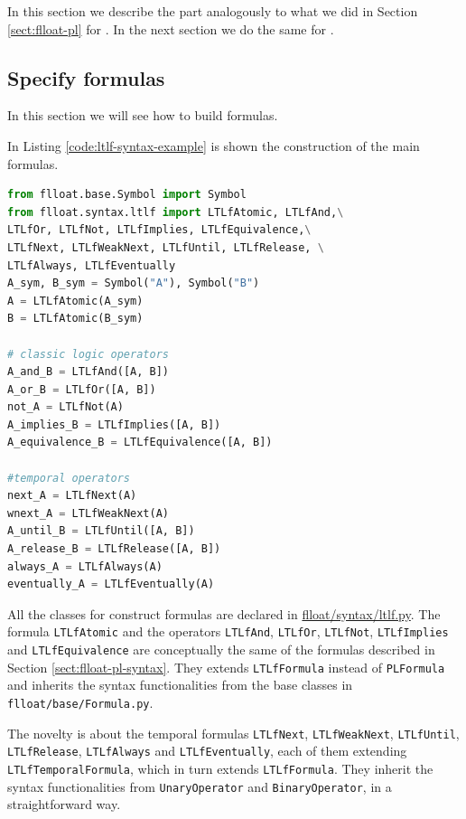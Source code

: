 In this section we describe the \LTLf part analogously to what we did in Section \ref{sect:flloat-pl} for \PL. In the next section we do the same for \LDLf.

\subsection{Specify \LTLf formulas}\label{sect:flloat-ltlf-syntax}
In this section we will see how to build \LTLf formulas.

In Listing \ref{code:ltlf-syntax-example} is shown the construction of the main \LTLf formulas.

\begin{lstlisting}[language=Python, style=Python, escapechar = £, label={code:ltlf-syntax-example}, caption={Examples of \LTLf formulas}]
from flloat.base.Symbol import Symbol
from flloat.syntax.ltlf import LTLfAtomic, LTLfAnd,\
LTLfOr, LTLfNot, LTLfImplies, LTLfEquivalence,\
LTLfNext, LTLfWeakNext, LTLfUntil, LTLfRelease, \
LTLfAlways, LTLfEventually
A_sym, B_sym = Symbol("A"), Symbol("B")
A = LTLfAtomic(A_sym)
B = LTLfAtomic(B_sym)

# classic logic operators
A_and_B = LTLfAnd([A, B])
A_or_B = LTLfOr([A, B])
not_A = LTLfNot(A)
A_implies_B = LTLfImplies([A, B])
A_equivalence_B = LTLfEquivalence([A, B])

#temporal operators
next_A = LTLfNext(A)
wnext_A = LTLfWeakNext(A)
A_until_B = LTLfUntil([A, B])
A_release_B = LTLfRelease([A, B])
always_A = LTLfAlways(A)
eventually_A = LTLfEventually(A)
\end{lstlisting}
All the classes for construct \LTLf formulas are declared in \href{https://github.com/MarcoFavorito/flloat/blob/0.1.4/flloat/syntax/ltlf.py}{flloat/syntax/ltlf.py}.
The formula \texttt{LTLfAtomic} and the operators \texttt{LTLfAnd}, \texttt{LTLfOr}, \texttt{LTLfNot}, \texttt{LTLfImplies} and \texttt{LTLfEquivalence} are conceptually the same of the \PL formulas described in Section \ref{sect:flloat-pl-syntax}. They extends \texttt{LTLfFormula} instead of \texttt{PLFormula} and inherits the syntax functionalities from the base classes in \texttt{flloat/base/Formula.py}.

The novelty is about the temporal formulas \texttt{LTLfNext}, \texttt{LTLfWeakNext}, \texttt{LTLfUntil}, \texttt{LTLfRelease}, \texttt{LTLfAlways} and \texttt{LTLfEventually}, each of them extending \texttt{LTLfTemporalFormula}, which in turn extends \texttt{LTLfFormula}. They inherit the syntax functionalities from \texttt{UnaryOperator} and \texttt{BinaryOperator}, in a straightforward way.

